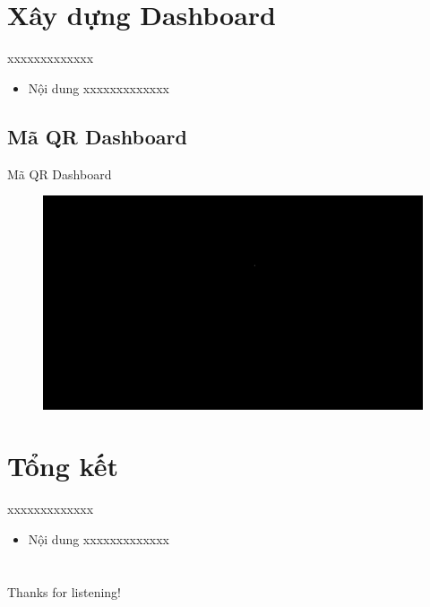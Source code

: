 \documentclass{beamer}
\begin{document}
\section{Xây dựng Dashboard}
\begin{frame}{xxxxxxxxxxxxx}
\begin{itemize}
\item Nội dung xxxxxxxxxxxxx
\end{itemize}
\end{frame}
\subsection{Mã QR Dashboard}
\begin{frame}{Mã QR Dashboard}

\begin{figure}[H]
\centering
\includegraphics[scale = 0.15]{pictures/black.png}
\end{figure}

\end{frame}
\section{Tổng kết}
\begin{frame}{xxxxxxxxxxxxx}
\begin{itemize}
\item Nội dung xxxxxxxxxxxxx
\end{itemize}
\end{frame}

\section*{}
\begin{frame}{}
\centering
\Huge{Thanks for listening!}
\end{frame}
\end{document}

